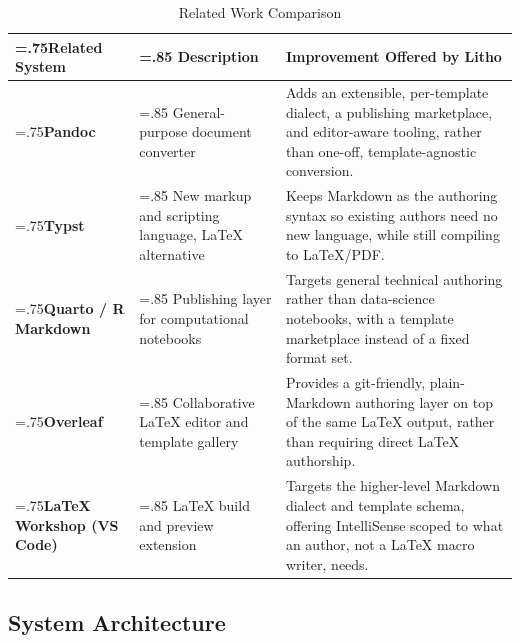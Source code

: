 \documentclass[a4paper,twoside]{article}
\begin{document}
\begin{table}[H]
  \centering
  \begin{tabularx}{\textwidth}{>{\raggedright\arraybackslash\hsize=.75\hsize}X >{\raggedright\arraybackslash\hsize=.85\hsize}X >{\raggedright\arraybackslash\hsize=1.4\hsize}X}
    \toprule
    \textbf{Related System} & \textbf{Description} & \textbf{Improvement Offered by Litho} \\
    \midrule
    \textbf{Pandoc}~\cite{ref3} & General-purpose document converter & Adds an extensible, per-template dialect, a publishing marketplace, and editor-aware tooling, rather than one-off, template-agnostic conversion. \\
    \textbf{Typst}~\cite{ref5} & New markup and scripting language, LaTeX alternative & Keeps Markdown as the authoring syntax so existing authors need no new language, while still compiling to LaTeX/PDF. \\
    \textbf{Quarto / R Markdown}~\cite{ref4} & Publishing layer for computational notebooks & Targets general technical authoring rather than data-science notebooks, with a template marketplace instead of a fixed format set. \\
    \textbf{Overleaf} & Collaborative LaTeX editor and template gallery & Provides a git-friendly, plain-Markdown authoring layer on top of the same LaTeX output, rather than requiring direct LaTeX authorship. \\
    \textbf{LaTeX Workshop (VS Code)} & LaTeX build and preview extension & Targets the higher-level Markdown dialect and template schema, offering IntelliSense scoped to what an author, not a LaTeX macro writer, needs. \\
    \bottomrule
  \end{tabularx}
  \caption{Related Work Comparison}
  \label{tab:related-work}
\end{table}

\subsection{System Architecture}
\end{document}
